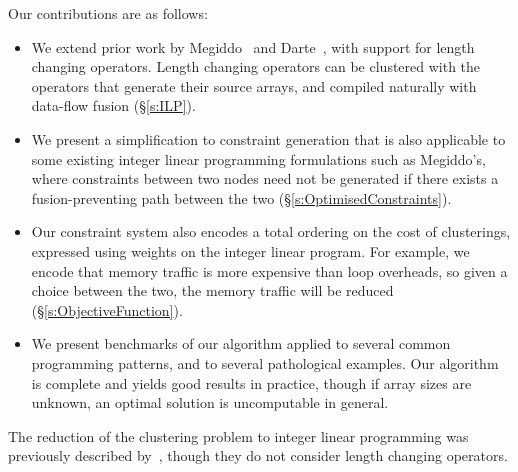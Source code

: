 Our contributions are as follows:
\begin{itemize}
\item   
We extend prior work by Megiddo~\cite{megiddo1998optimal} and Darte~\cite{darte2002contraction}, with support for length changing operators. Length changing operators can be clustered with the operators that generate their source arrays, and compiled naturally with data-flow fusion (\S\ref{s:ILP}).

\item
We present a simplification to constraint generation that is also applicable to some existing integer linear programming formulations such as Megiddo's,
where constraints between two nodes need not be generated if there exists a fusion-preventing path between the two (\S\ref{s:OptimisedConstraints}).

\item
Our constraint system also encodes a total ordering on the cost of clusterings, expressed using weights on the integer linear program. For example, we encode that memory traffic is more expensive than loop overheads, so given a choice between the two, the memory traffic will be reduced (\S\ref{s:ObjectiveFunction}).

\item
We present benchmarks of our algorithm applied to several common programming patterns, and to several pathological examples.
Our algorithm is complete and yields good results in practice, though if array sizes are unknown, an optimal solution is uncomputable in general. 
\end{itemize}

The reduction of the clustering problem to integer linear programming was previously described by~\cite{megiddo1998optimal}, though they do not consider length changing operators.




